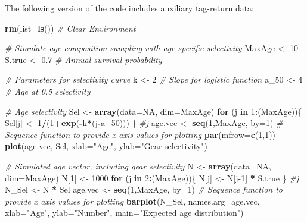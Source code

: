 \documentclass[
]{krantz}
\makeatletter
\newenvironment{Shaded}{\begin{snugshade}}{\end{snugshade}}
\newcommand{\AttributeTok}[1]{\textcolor[rgb]{0.27,0.27,0.27}{#1}}
\newcommand{\CommentTok}[1]{\textcolor[rgb]{0.37,0.37,0.37}{\textit{#1}}}
\newcommand{\ConstantTok}[1]{\textcolor[rgb]{0.37,0.37,0.37}{#1}}
\newcommand{\ControlFlowTok}[1]{\textcolor[rgb]{0.27,0.27,0.27}{\textbf{#1}}}
\newcommand{\DecValTok}[1]{\textcolor[rgb]{0.06,0.06,0.06}{#1}}
\newcommand{\FloatTok}[1]{\textcolor[rgb]{0.06,0.06,0.06}{#1}}
\newcommand{\FunctionTok}[1]{\textcolor[rgb]{0.27,0.27,0.27}{\textbf{#1}}}
\newcommand{\NormalTok}[1]{#1}
\newcommand{\OtherTok}[1]{\textcolor[rgb]{0.37,0.37,0.37}{#1}}
\newcommand{\SpecialCharTok}[1]{\textcolor[rgb]{0.43,0.43,0.43}{\textbf{#1}}}
\newcommand{\StringTok}[1]{\textcolor[rgb]{0.5,0.5,0.5}{#1}}
\newenvironment{kframe}{%
\medskip{}
\setlength{\fboxsep}{.8em}
 \def\at@end@of@kframe{}%
 \ifinner\ifhmode%
  \def\at@end@of@kframe{\end{minipage}}%
  \begin{minipage}{\columnwidth}%
 \fi\fi%
 \def\FrameCommand##1{\hskip\@totalleftmargin \hskip-\fboxsep
 \colorbox{shadecolor}{##1}\hskip-\fboxsep
     \hskip-\linewidth \hskip-\@totalleftmargin \hskip\columnwidth}%
 \MakeFramed {\advance\hsize-\width
   \@totalleftmargin\z@ \linewidth\hsize
   \@setminipage}}%
 {\par\unskip\endMakeFramed%
 \at@end@of@kframe}
\renewenvironment{Shaded}{\begin{kframe}}{\end{kframe}}
\makeatother
\begin{document}
The following version of the code includes auxiliary tag-return data:

\begin{Shaded}
\begin{Highlighting}[]
\FunctionTok{rm}\NormalTok{(}\AttributeTok{list=}\FunctionTok{ls}\NormalTok{()) }\CommentTok{\# Clear Environment}

\CommentTok{\# Simulate age composition sampling with age{-}specific selectivity}
\NormalTok{MaxAge }\OtherTok{\textless{}{-}} \DecValTok{10}
\NormalTok{S.true }\OtherTok{\textless{}{-}} \FloatTok{0.7} \CommentTok{\# Annual survival probability}

\CommentTok{\# Parameters for selectivity curve}
\NormalTok{k }\OtherTok{\textless{}{-}} \DecValTok{2} \CommentTok{\# Slope for logistic function}
\NormalTok{a\_50 }\OtherTok{\textless{}{-}} \DecValTok{4} \CommentTok{\# Age at 0.5 selectivity}

\CommentTok{\# Age selectivity}
\NormalTok{Sel }\OtherTok{\textless{}{-}} \FunctionTok{array}\NormalTok{(}\AttributeTok{data=}\ConstantTok{NA}\NormalTok{, }\AttributeTok{dim=}\NormalTok{MaxAge)}
\ControlFlowTok{for}\NormalTok{ (j }\ControlFlowTok{in} \DecValTok{1}\SpecialCharTok{:}\NormalTok{(MaxAge))\{}
\NormalTok{  Sel[j] }\OtherTok{\textless{}{-}} \DecValTok{1}\SpecialCharTok{/}\NormalTok{(}\DecValTok{1}\SpecialCharTok{+}\FunctionTok{exp}\NormalTok{(}\SpecialCharTok{{-}}\NormalTok{k}\SpecialCharTok{*}\NormalTok{(j}\SpecialCharTok{{-}}\NormalTok{a\_50)))}
\NormalTok{\} }\CommentTok{\#j}
\NormalTok{age.vec }\OtherTok{\textless{}{-}} \FunctionTok{seq}\NormalTok{(}\DecValTok{1}\NormalTok{,MaxAge, }\AttributeTok{by=}\DecValTok{1}\NormalTok{)  }\CommentTok{\# Sequence function to provide x axis values for plotting}
\FunctionTok{par}\NormalTok{(}\AttributeTok{mfrow=}\FunctionTok{c}\NormalTok{(}\DecValTok{1}\NormalTok{,}\DecValTok{1}\NormalTok{))}
\FunctionTok{plot}\NormalTok{(age.vec, Sel, }\AttributeTok{xlab=}\StringTok{"Age"}\NormalTok{, }\AttributeTok{ylab=}\StringTok{"Gear selectivity"}\NormalTok{)}

\CommentTok{\# Simulated age vector, including gear selectivity}
\NormalTok{N }\OtherTok{\textless{}{-}} \FunctionTok{array}\NormalTok{(}\AttributeTok{data=}\ConstantTok{NA}\NormalTok{, }\AttributeTok{dim=}\NormalTok{MaxAge)}
\NormalTok{N[}\DecValTok{1}\NormalTok{] }\OtherTok{\textless{}{-}} \DecValTok{1000}
\ControlFlowTok{for}\NormalTok{ (j }\ControlFlowTok{in} \DecValTok{2}\SpecialCharTok{:}\NormalTok{(MaxAge))\{}
\NormalTok{  N[j] }\OtherTok{\textless{}{-}}\NormalTok{ N[j}\DecValTok{{-}1}\NormalTok{] }\SpecialCharTok{*}\NormalTok{ S.true}
\NormalTok{\} }\CommentTok{\#j}
\NormalTok{N\_Sel }\OtherTok{\textless{}{-}}\NormalTok{ N }\SpecialCharTok{*}\NormalTok{ Sel}
\NormalTok{age.vec }\OtherTok{\textless{}{-}} \FunctionTok{seq}\NormalTok{(}\DecValTok{1}\NormalTok{,MaxAge, }\AttributeTok{by=}\DecValTok{1}\NormalTok{)  }\CommentTok{\# Sequence function to provide x axis values for plotting}
\FunctionTok{barplot}\NormalTok{(N\_Sel, }\AttributeTok{names.arg=}\NormalTok{age.vec, }\AttributeTok{xlab=}\StringTok{"Age"}\NormalTok{, }\AttributeTok{ylab=}\StringTok{"Number"}\NormalTok{, }\AttributeTok{main=}\StringTok{"Expected age distribution"}\NormalTok{)}


\end{Highlighting}
\end{Shaded}
\end{document}

